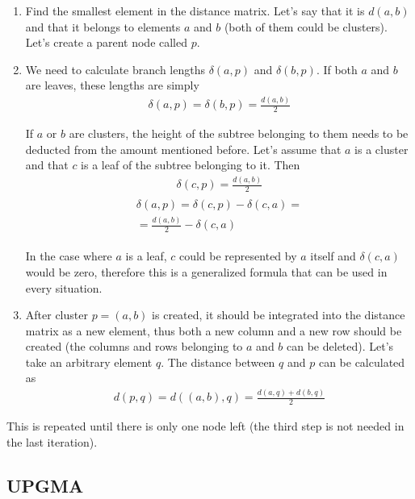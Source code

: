 \documentclass[11pt,twocolumn]{article}
\begin{document}
\begin{enumerate}
\item Find the smallest element in the distance matrix. Let's say that it is $d(a, b)$ and that it belongs to elements $a$ and $b$ (both of them could be clusters). Let's create a parent node called $p$.

\item We need to calculate branch lengths $\delta(a, p)$ and $\delta(b, p)$. If both $a$ and $b$ are leaves, these lengths are simply
\begin{align}
\delta(a, p) = \delta(b, p) = \frac{d(a, b)}{2}
\end{align}

If $a$ or $b$ are clusters, the height of the subtree belonging to them needs to be deducted from the amount mentioned before. Let's assume that $a$ is a cluster and that $c$ is a leaf of the subtree belonging to it. Then
\begin{align}
\delta(c, p) = \frac{d(a, b)}{2}
\end{align}
\begin{align}
\begin{split}
\delta(a, p) = \delta(c, p) - \delta(c, a) = \\
= \frac{d(a, b)}{2} - \delta(c, a)
\end{split}
\end{align}

In the case where $a$ is a leaf, $c$ could be represented by $a$ itself and $\delta(c, a)$ would be zero, therefore this is a generalized formula that can be used in every situation.

\item After cluster $p = (a, b)$ is created, it should be integrated into the distance matrix as a new element, thus both a new column and a new row should be created (the columns and rows belonging to $a$ and $b$ can be deleted). Let's take an arbitrary element $q$. The distance between $q$ and $p$ can be calculated as
\begin{align}
d(p, q) = d((a, b), q) = \frac{d(a, q) + d(b, q)}{2}
\end{align}

\end{enumerate}

This is repeated until there is only one node left (the third step is not needed in the last iteration).

\subsection*{UPGMA}
\end{document}
